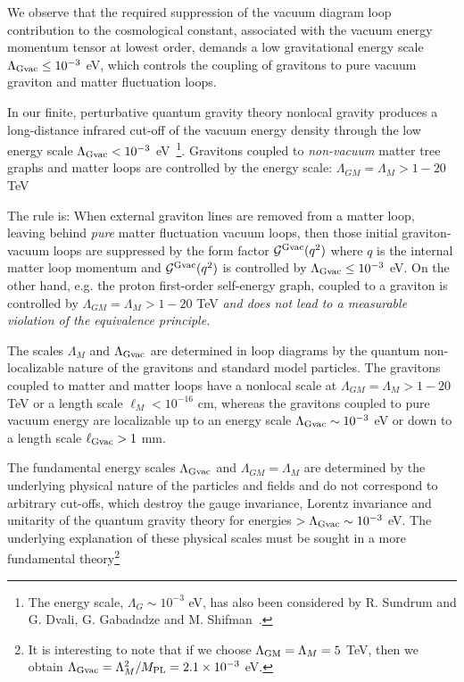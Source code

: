 \documentclass[a4paper,12pt]{article}
\begin{document}
We observe that the required suppression of the vacuum diagram
loop contribution to the cosmological constant, associated with
the vacuum energy momentum tensor at lowest order,
demands a low gravitational energy scale $\Lambda_{{\rm Gvac}}\leq
10^{-3}$ eV, which controls the coupling of gravitons to
pure vacuum graviton and matter fluctuation loops.

In our finite, perturbative
quantum gravity theory nonlocal gravity produces a long-distance
infrared cut-off of the vacuum energy density through the low energy
scale $\Lambda_{{\rm Gvac}} < 10^{-3}$ eV~\cite{Moffat2}\footnote{The energy scale,
$\Lambda_G\sim 10^{-3}$ eV, has also
been considered by R. Sundrum and G. Dvali, G. Gabadadze and M.
Shifman~\cite{Sundrum}.}.
Gravitons coupled to {\it non-vacuum} matter tree graphs and matter loops
are controlled by the energy scale: $\Lambda_{GM}=\Lambda_{M} > 1-20$
TeV

The rule is: When external graviton lines are removed from a
matter loop, leaving behind {\it pure} matter fluctuation vacuum loops,
then those initial graviton-vacuum loops are suppressed by the form factor
${\cal G}^{{\rm Gvac}}(q^2)$ where $q$ is the internal matter loop momentum and
${\cal G}^{{\rm Gvac}}(q^2)$ is controlled by $\Lambda_{{\rm Gvac}} \leq 10^{-3}$ eV.
On the other hand, e.g. the proton first-order self-energy graph, coupled
to a graviton is controlled by $\Lambda_{GM}=\Lambda_M > 1-20$ TeV {\it
and does not lead to a measurable violation of the equivalence principle.}

The scales $\Lambda_M$ and $\Lambda_{{\rm Gvac}}$ are determined in
loop diagrams by the quantum non-localizable nature of the gravitons and
standard model particles. The gravitons coupled to matter and matter
loops have a nonlocal scale at $\Lambda_{GM}=\Lambda_M > 1-20$ TeV or a
length scale $\ell_M < 10^{-16}$ cm, whereas the gravitons coupled to
pure vacuum energy are localizable up to an energy scale
$\Lambda_{{\rm Gvac}}\sim 10^{-3}$ eV or down to a length scale $\ell_{{\rm Gvac}} > 1$
mm.

The fundamental energy scales $\Lambda_{{\rm Gvac}}$ and
$\Lambda_{GM}=\Lambda_M$ are determined by the underlying physical nature
of the particles and fields and do not correspond to arbitrary cut-offs,
which destroy the gauge invariance, Lorentz invariance and unitarity of the
quantum gravity theory for energies $>\Lambda_{{\rm Gvac}}\sim 10^{-3}$ eV.
The underlying explanation of these physical scales must be sought in a
more fundamental theory\footnote{It is interesting to note that if we
choose $\Lambda_{\rm GM}=\Lambda_M=5$ TeV, then we obtain
$\Lambda_{\rm Gvac}=\Lambda_M^2/M_{\rm PL}=2.1\times 10^{-3}$ eV.}
\end{document}
